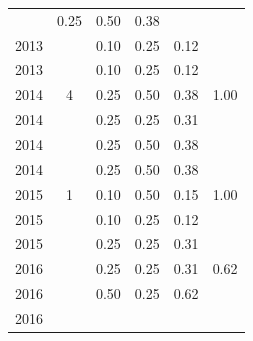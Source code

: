\begin{table}[H]
\begin{tabular}{| l | c | c | c | c | c |}
          &
          0.25
          &
          0.50
          &
          0.38
          &
          \\
            2013
          &
          
          &
          0.10
          &
          0.25
          &
          0.12
          &
          \\
            2013
          &
          
          &
          0.10
          &
          0.25
          &
          0.12
          &
          \\
\hline
            2014
          &
          4
          &
          0.25
          &
          0.50
          &
          0.38
          &
            {\color{blue} 1.00}
          \\
            2014
          &
          
          &
          0.25
          &
          0.25
          &
          0.31
          &
          \\
            2014
          &
          
          &
          0.25
          &
          0.50
          &
          0.38
          &
          \\
            2014
          &
          
          &
          0.25
          &
          0.50
          &
          0.38
          &
          \\
\hline
            2015
          &
          1
          &
          0.10
          &
          0.50
          &
          0.15
          &
            {\color{blue} 1.00}
          \\
            2015
          &
          
          &
          0.10
          &
          0.25
          &
          0.12
          &
          \\
            2015
          &
          
          &
          0.25
          &
          0.25
          &
          0.31
          &
          \\
\hline
            2016
          &
          
          &
          0.25
          &
          0.25
          &
          0.31
          &
            {\color{blue} 0.62}
          \\
            2016
          &
          
          &
          0.50
          &
          0.25
          &
          0.62
          &
          \\
            2016
          &
          

\end{tabular}
\end{table}
